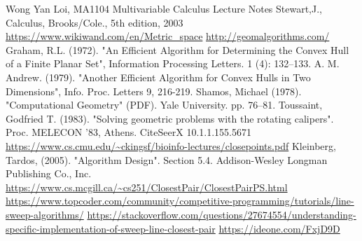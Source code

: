 \documentclass[12pt]{article}
\begin{document}
\newpage
\begin{thebibliography}{11}
  Wong Yan Loi, MA1104 Multivariable Calculus Lecture Notes
  Stewart,J., Calculus, Brooks/Cole., 5th edition, 2003
  \url{https://www.wikiwand.com/en/Metric_space}
  \url{http://geomalgorithms.com/}
  Graham, R.L. (1972). "An Efficient Algorithm for Determining the Convex Hull of a Finite Planar Set", Information Processing Letters. 1 (4): 132–133. 
  A. M. Andrew. (1979). "Another Efficient Algorithm for Convex Hulls in Two Dimensions", Info. Proc. Letters 9, 216-219.
  Shamos, Michael (1978). "Computational Geometry" (PDF). Yale University. pp. 76–81.
  Toussaint, Godfried T. (1983). "Solving geometric problems with the rotating calipers". Proc. MELECON '83, Athens. CiteSeerX 10.1.1.155.5671
  \url{https://www.cs.cmu.edu/~ckingsf/bioinfo-lectures/closepoints.pdf}
  Kleinberg, Tardos, (2005). "Algorithm Design". Section 5.4. Addison-Wesley Longman Publishing Co., Inc.
  \url{https://www.cs.mcgill.ca/~cs251/ClosestPair/ClosestPairPS.html}
  \url{https://www.topcoder.com/community/competitive-programming/tutorials/line-sweep-algorithms/}
  \url{https://stackoverflow.com/questions/27674554/understanding-specific-implementation-of-sweep-line-closest-pair}
  \url{https://ideone.com/FxjD9D}

\end{thebibliography}        
\end{document}
